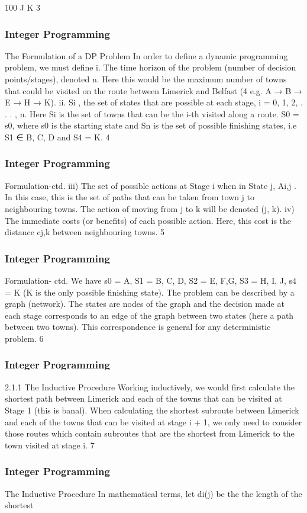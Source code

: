 \begin{frame}
100
J
K
3 \end{frame}  \begin{frame} \frametitle{Integer Programming}     
The Formulation of a DP Problem
In order to define a dynamic programming problem, we must define
i. The time horizon of the problem (number of decision
points/stages), denoted n.
Here this would be the maximum number of towns
that could be visited on the route between Limerick
and Belfast (4 e.g. A → B → E → H → K).
ii. Si
, the set of states that are possible at each stage,
i = 0, 1, 2, . . . , n.
Here Si
is the set of towns that can be the i-th
visited along a route. S0 = {s0}, where s0 is the
starting state and Sn is the set of possible finishing
states, i.e S1 ∈ {B, C, D} and S4 = K.
4 \end{frame}  \begin{frame} \frametitle{Integer Programming}     
Formulation-ctd.
iii) The set of possible actions at Stage i when in State
j, Ai,j
.
In this case, this is the set of paths that can be taken
from town j to neighbouring towns. The action of
moving from j to k will be denoted (j, k).
iv) The immediate costs (or benefits) of each possible
action.
Here, this cost is the distance cj,k between
neighbouring towns.
5 \end{frame}  \begin{frame} \frametitle{Integer Programming}     
Formulation- ctd.
We have s0 = A, S1 = {B, C, D}, S2 = {E, F,G}, S3 = {H, I, J},
s4 = K (K is the only possible finishing state).
The problem can be described by a graph (network).
The states are nodes of the graph and the decision made at each
stage corresponds to an edge of the graph between two states
(here a path between two towns).
This correspondence is general for any deterministic problem.
6 \end{frame}  \begin{frame} \frametitle{Integer Programming}     
2.1.1 The Inductive Procedure
Working inductively, we would first calculate the shortest path
between Limerick and each of the towns that can be visited at
Stage 1 (this is banal).
When calculating the shortest subroute between Limerick and each
of the towns that can be visited at stage i + 1, we only need to
consider those routes which contain subroutes that are the shortest
from Limerick to the town visited at stage i.
7 \end{frame}  \begin{frame} \frametitle{Integer Programming}     
The Inductive Procedure
In mathematical terms, let di(j) be the the length of the shortest

\end{frame}

